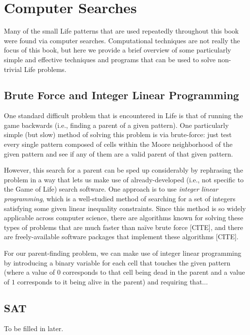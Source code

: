 \chapter{Computer Searches}\label{apx:sat}

Many of the small Life patterns that are used repeatedly throughout this book were found via computer searches. Computational techniques are not really the focus of this book, but here we provide a brief overview of some particularly simple and effective techniques and programs that can be used to solve non-trivial Life problems.


\section{Brute Force and Integer Linear Programming}\label{sec:ilp}

One standard difficult problem that is encountered in Life is that of running the game backwards (i.e., finding a parent of a given pattern). One particularly simple (but slow) method of solving this problem is via brute-force: just test every single pattern composed of cells within the Moore neighborhood of the given pattern and see if any of them are a valid parent of that given pattern.

However, this search for a parent can be sped up considerably by rephrasing the problem in a way that lets us make use of already-developed (i.e., not specific to the Game of Life) search software. One approach is to use \emph{integer linear programming}, which is a well-studied method of searching for a set of integers satisfying some given linear inequality constraints. Since this method is so widely applicable across computer science, there are algorithms known for solving these types of problems that are much faster than na\"{i}ve brute force [CITE], and there are freely-available software packages that implement these algorithms [CITE].

For our parent-finding problem, we can make use of integer linear programming by introducing a binary variable for each cell that touches the given pattern (where a value of $0$ corresponds to that cell being dead in the parent and a value of $1$ corresponds to it being alive in the parent) and requiring that...




\section{SAT}\label{sec:sat}

To be filled in later.



